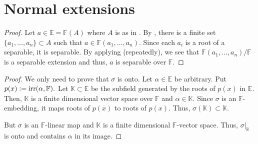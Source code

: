 \section{Normal extensions}

\seppolysplittingfields*\label{prop:seppolysplittingfields2}
\begin{flushright}\hyperref[prop:seppolysplittingfields]{\upsym}\end{flushright}
\begin{proof}
    Let $a \in \mathbb{E} = \mathbb{F}(A)$ where $A$ is as in . By , there is a finite set $\{a_1, \ldots, a_n\} \subset A$ such that $a \in \mathbb{F}(a_1, \ldots, a_n).$ Since each $a_i$ is a root of a separable, it is separable. By applying  (repeatedly), we see that $\mathbb{F}(a_1, \ldots, a_n)/\mathbb{F}$ is a separable extension and thus, $a$ is separable over $\mathbb{F}.$
\end{proof}

\algebraicautomorphism*\label{lem:algebraicautomorphism2}
\begin{flushright}\hyperref[lem:algebraicautomorphism]{\upsym}\end{flushright}
\begin{proof}
    We only need to prove that $\sigma$ is onto. Let $\alpha \in \mathbb{E}$ be arbitrary. Put $p(x) \vcentcolon= \operatorname{irr}(\alpha, \mathbb{F}).$ Let $\mathbb{K} \subset \mathbb{E}$ be the subfield generated by the roots of $p(x)$ in $\mathbb{E}.$ Then, $\mathbb{K}$ is a finite dimensional vector space over $\mathbb{F}$ and $\alpha \in \mathbb{K}.$ Since $\sigma$ is an $\mathbb{F}$-embedding, it maps roots of $p(x)$ to roots of $p(x).$ Thus, $\sigma(\mathbb{K}) \subset \mathbb{K}.$

    But $\sigma$ is an $\mathbb{F}$-linear map and $\mathbb{K}$ is a finite dimensional $\mathbb{F}$-vector space. Thus, $\sigma|_{\mathbb{K}}$ is onto and contains $\alpha$ in its image.
\end{proof}

